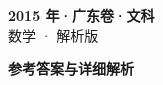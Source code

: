 \documentclass[zihao=-4, a4paper]{ctexart}
\begin{document}
\begin{center}
  {\Large\bfseries 2015 年·广东卷·文科}\\[4pt]
  {\large 数学 · 解析版}
\end{center}
\medskip
{}

\clearpage
{}
\begin{center}{\Large\bfseries 参考答案与详细解析}\end{center}
\medskip

\end{document}
